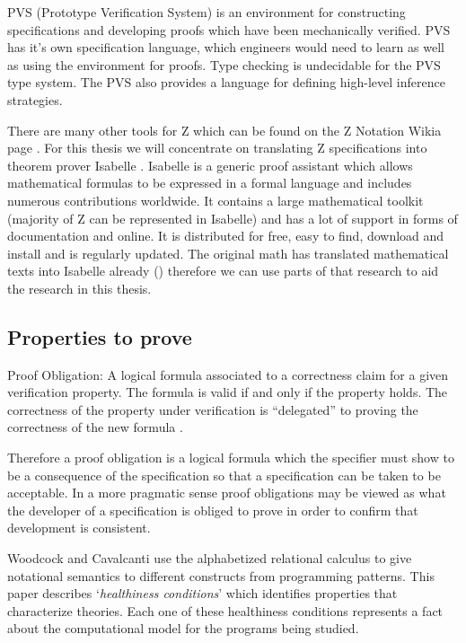 PVS (Prototype Verification System) \cite{pvs} is an environment for
constructing specifications and developing proofs which have been mechanically
verified. PVS has it's own specification language, which engineers would need to
learn as well as using the environment for proofs. Type checking is undecidable
for the PVS type system. The PVS also provides a language for defining
high-level inference strategies.

There are many other tools for Z which can be found on the Z Notation Wikia page
\cite{zwikia}. For this thesis we will concentrate on translating Z
specifications into theorem prover Isabelle \cite{isabelle}. Isabelle is a
generic proof assistant which allows mathematical formulas to be expressed in a
formal language and includes numerous contributions worldwide. It contains a
large mathematical toolkit (majority of Z can be represented in Isabelle) and
has a lot of support in forms of documentation and online. It is distributed for
free, easy to find, download and install and is regularly updated. The original
\gls{math} has translated mathematical texts into Isabelle already
(\cite{mathintoisa}) therefore we can use parts of that research to aid the
research in this thesis.

\subsection{Properties to prove}
\label{subsec:propertiestoprove}

\begin{defin}
Proof Obligation: A logical formula associated to a correctness claim for a given verification
property. The formula is valid if and only if the property holds. The
correctness of the property under verification is “delegated” to proving the
correctness of the new formula \cite{handbookofembed}.
\end{defin}

Therefore a proof obligation is a logical formula which the specifier must show
to be a consequence of the specification so that a specification can be taken to
be acceptable. In a more pragmatic sense proof obligations may be viewed as what
the developer of a specification is obliged to prove in order to confirm that
development is consistent.

Woodcock and Cavalcanti \cite{woodcock2004tutorial} use the alphabetized
relational calculus to give notational semantics to different constructs from
programming patterns. This paper describes `\emph{healthiness conditions}' which
identifies properties that characterize theories. Each one of these healthiness
conditions represents a fact about the computational model for the programs
being studied.


